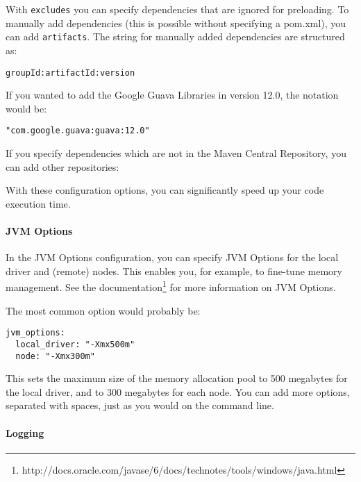 

With \texttt{excludes} you can specify dependencies that are ignored for preloading. To manually add dependencies (this is possible without specifying a pom.xml), you can add \texttt{artifacts}. The string for manually added dependencies are structured as: 

\begin{lstlisting}[breaklines=true]
groupId:artifactId:version
\end{lstlisting}

If you wanted to add the Google Guava Libraries in version 12.0, the notation would be:

\begin{lstlisting}[breaklines=true]
"com.google.guava:guava:12.0"
\end{lstlisting}

If you specify dependencies which are not in the Maven Central Repository, you can add other repositories:



With these configuration options, you can significantly speed up your code execution time.

\paragraph{JVM Options}

In the JVM Options configuration, you can specify JVM Options for the local driver and (remote) nodes. This enables you, for example, to fine-tune memory management. See the documentation\footnote{http://docs.oracle.com/javase/6/docs/technotes/tools/windows/java.html} for more information on JVM Options.

The most common option would probably be:

\begin{lstlisting}[breaklines=true, frame=single]
jvm_options:
  local_driver: "-Xmx500m"
  node: "-Xmx300m"
\end{lstlisting}

This sets the maximum size of the memory allocation pool to 500 megabytes for the local driver, and to 300 megabytes for each node. You can add more options, separated with spaces, just as you would on the command line.

\paragraph{Logging}


